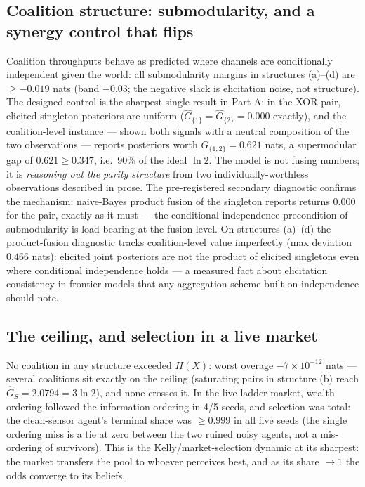 \documentclass{article} %
\newcommand{\Ghat}{\hat{G}}
\begin{document}
\subsection{Coalition structure: submodularity, and a synergy control that flips}
\label{sec:xor}

Coalition throughputs behave as predicted where channels are conditionally independent given the world: all submodularity margins in structures (a)--(d) are $\geq -0.019$ nats (band $-0.03$; the negative slack is elicitation noise, not structure). The designed control is the sharpest single result in Part A: in the XOR pair, elicited singleton posteriors are uniform ($\Ghat_{\{1\}} = \Ghat_{\{2\}} = 0.000$ exactly), and the coalition-level instance --- shown both signals with a neutral composition of the two observations --- reports posteriors worth $\Ghat_{\{1,2\}} = 0.621$ nats, a supermodular gap of $0.621 \geq 0.347$, i.e.\ 90\% of the ideal $\ln 2$. The model is not fusing numbers; it is \emph{reasoning out the parity structure} from two individually-worthless observations described in prose. The pre-registered secondary diagnostic confirms the mechanism: naive-Bayes product fusion of the singleton reports returns $0.000$ for the pair, exactly as it must --- the conditional-independence precondition of submodularity is load-bearing at the fusion level. On structures (a)--(d) the product-fusion diagnostic tracks coalition-level value imperfectly (max deviation $0.466$ nats): elicited joint posteriors are not the product of elicited singletons even where conditional independence holds --- a measured fact about elicitation consistency in frontier models that any aggregation scheme built on independence should note.

\subsection{The ceiling, and selection in a live market}

No coalition in any structure exceeded $H(X)$: worst overage $-7 \times 10^{-12}$ nats --- several coalitions sit exactly on the ceiling (saturating pairs in structure (b) reach $\Ghat_S = 2.0794 = 3\ln2$), and none crosses it. In the live ladder market, wealth ordering followed the information ordering in 4/5 seeds, and selection was total: the clean-sensor agent's terminal share was $\geq 0.999$ in all five seeds (the single ordering miss is a tie at zero between the two ruined noisy agents, not a mis-ordering of survivors). This is the Kelly/market-selection dynamic \citep{blume1992,sandroni2000} at its sharpest: the market transfers the pool to whoever perceives best, and as its share $\to 1$ the odds converge to its beliefs.
\end{document}
